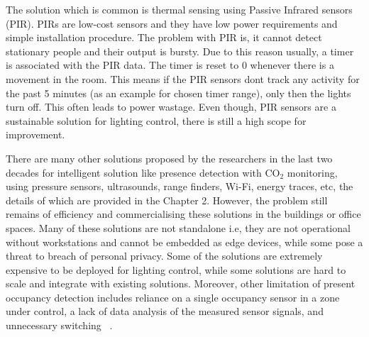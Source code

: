 The solution which is common is thermal sensing using Passive Infrared sensors (PIR). PIRs are low-cost sensors and they have low power requirements and simple installation procedure. The problem with PIR is, it cannot detect stationary people and their output is bursty. Due to this reason usually, a timer is associated with the PIR data. The timer is reset to 0 whenever there is a movement in the room. This means if the PIR sensors don\textquotesingle t track any activity for the past 5 minutes (as an example for chosen timer range), only then the lights turn off. This often leads to power wastage. Even though, PIR sensors are a sustainable solution for lighting control, there is still a high scope for improvement.

There are many other solutions proposed by the researchers in the last two decades for intelligent solution like presence detection with CO$_{2}$ monitoring, using pressure sensors, ultrasounds, range finders, Wi-Fi, energy traces,  etc, the details of which are provided in the Chapter 2. However, the problem still remains of efficiency and commercialising these solutions in the buildings or office spaces. Many of these solutions are not standalone i.e, they are not operational without workstations and cannot be embedded as edge devices, while some pose a threat to breach of personal privacy. Some of the solutions are extremely expensive to be deployed for lighting control, while some solutions are hard to scale and integrate with existing solutions. Moreover, other limitation of present occupancy detection includes reliance on a single occupancy sensor in a zone under control, a lack of data analysis of the measured sensor signals, and unnecessary switching ~\cite{dodier2006building}.
 

